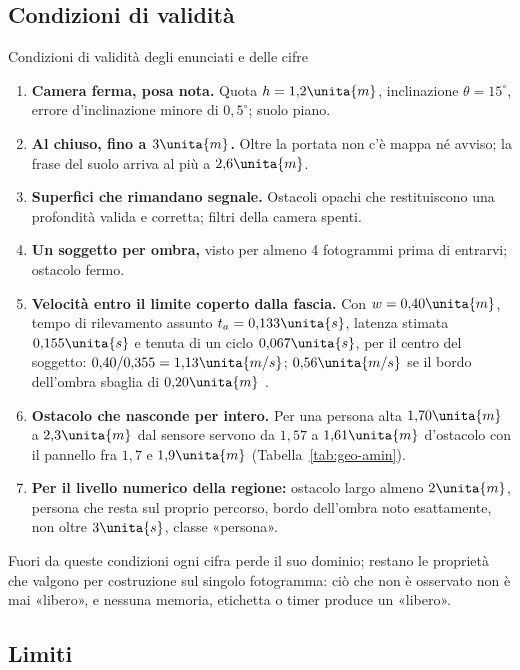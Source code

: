 \subsection{Condizioni di validità}\label{sec:lim-validita}

\begin{riquadro}{Condizioni di validità degli enunciati e delle cifre}
\begin{enumerate}[label=\arabic*.,itemsep=1pt]
\item \textbf{Camera ferma, posa nota.} Quota $h=1{,}2\unita{m}$, inclinazione $\theta=15^\circ$, errore d'inclinazione minore di $0{,}5^\circ$; suolo piano.
\item \textbf{Al chiuso, fino a $3\unita{m}$.} Oltre la portata non c'è mappa né avviso; la frase del suolo arriva al più a $2{,}6\unita{m}$.
\item \textbf{Superfici che rimandano segnale.} Ostacoli opachi che restituiscono una profondità valida e corretta; filtri della camera spenti.
\item \textbf{Un soggetto per ombra,} visto per almeno 4 fotogrammi prima di entrarvi; ostacolo fermo.
\item \textbf{Velocità entro il limite coperto dalla fascia.} Con $w=0{,}40\unita{m}$, tempo di rilevamento assunto $t_a=0{,}133\unita{s}$, latenza stimata $0{,}155\unita{s}$ e tenuta di un ciclo $0{,}067\unita{s}$, per il centro del soggetto: $0{,}40/0{,}355=1{,}13\unita{m/s}$; $0{,}56\unita{m/s}$ se il bordo dell'ombra sbaglia di $0{,}20\unita{m}$ .
\item \textbf{Ostacolo che nasconde per intero.} Per una persona alta $1{,}70\unita{m}$ a $2{,}3\unita{m}$ dal sensore servono da $1{,}57$ a $1{,}61\unita{m}$ d'ostacolo con il pannello fra $1{,}7$ e $1{,}9\unita{m}$ (Tabella~\ref{tab:geo-amin}).
\item \textbf{Per il livello numerico della regione:} ostacolo largo almeno $2\unita{m}$, persona che resta sul proprio percorso, bordo dell'ombra noto esattamente, non oltre $3\unita{s}$, classe «persona».
\end{enumerate}
Fuori da queste condizioni ogni cifra perde il suo dominio; restano le proprietà che valgono per costruzione sul singolo fotogramma: ciò che non è osservato non è mai «libero», e nessuna memoria, etichetta o timer produce un «libero».
\end{riquadro}

\subsection{Limiti}\label{sec:lim-limiti}

